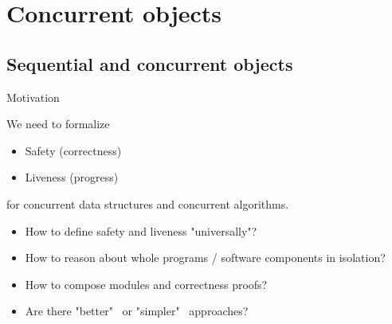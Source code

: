 %
%
%


\section{Concurrent objects}
\showTOC

\subsection{Sequential and concurrent objects}

\begin{frame}{Motivation}

We need to formalize
\begin{itemize}
  \item Safety (correctness)
  \item Liveness (progress)
\end{itemize}

\pause

for concurrent data structures and concurrent algorithms.

\pause
\begin{itemize}
  \item How to define safety and liveness "universally"?
  \item How to reason about whole programs / software components in isolation?
  \item How to compose modules and correctness proofs?
  \item Are there "better" \ or "simpler" \ approaches?
\end{itemize}
\end{frame}




